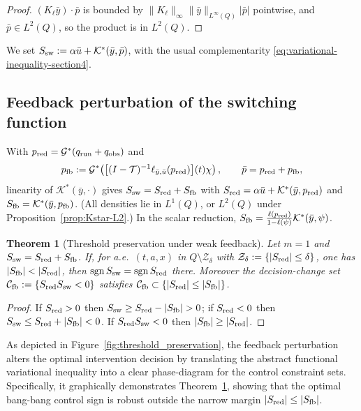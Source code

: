 \documentclass[pdflatex,sn-mathphys-num]{sn-jnl}
\theoremstyle{plain}
\newtheorem{theorem}{Theorem}[section]
\theoremstyle{definition}
\theoremstyle{remark}
\DeclareMathOperator{\sgn}{sgn}
\begin{document}
\begin{proof}
$(K_\ell\bar y)\cdot\bar p$ is bounded by $\|K_\ell\|_\infty\|\bar
y\|_{L^\infty(Q)}|\bar p|$ pointwise, and $\bar p\in L^2(Q)$, so the product is
in $L^2(Q)$.
\end{proof}

We set $S_{\rm sw}:=\alpha\bar u+\mathcal K^*(\bar y,\bar p)$, with the usual
complementarity \eqref{eq:variational-inequality-section4}.

\subsection{Feedback perturbation of the switching function}
\label{subsec:switching-perturbation}
With $p_{\rm red}=\mathcal G^*(q_{\rm run}+q_{\rm obs})$ and
\[
p_{\rm fb}
:=
\mathcal G^*\!\left(\big[(I-\mathcal T)^{-1}\ell_{\bar y,\bar u}(p_{\rm red})\big](t)\chi\right),
\qquad
\bar p=p_{\rm red}+p_{\rm fb},
\]
linearity of $\mathcal K^*(\bar y,\cdot)$ gives
$S_{\rm sw}=S_{\rm red}+S_{\rm fb}$ with
$S_{\rm red}=\alpha\bar u+\mathcal K^*(\bar y,p_{\rm red})$ and
$S_{\rm fb}=\mathcal K^*(\bar y,p_{\rm fb})$. (All densities lie in $L^1(Q)$,
or $L^2(Q)$ under Proposition~\ref{prop:Kstar-L2}.) In the scalar reduction,
$S_{\rm fb}=\frac{\ell(p_{\rm red})}{1-\ell(\psi)}\mathcal K^*(\bar y,\psi)$.

\begin{theorem}[Threshold preservation under weak feedback]
\label{thm:threshold-preservation}
Let $m=1$ and $S_{\rm sw}=S_{\rm red}+S_{\rm fb}$. If, for a.e.\ $(t,a,x)$ in
$Q\setminus\mathcal Z_\delta$ with
$\mathcal Z_\delta:=\{|S_{\rm red}|\le\delta\}$, one has
$|S_{\rm fb}|<|S_{\rm red}|$, then $\sgn S_{\rm sw}=\sgn S_{\rm red}$ there.
Moreover the decision-change set
$\mathcal C_{\rm fb}:=\{S_{\rm red}S_{\rm sw}<0\}$ satisfies
$\mathcal C_{\rm fb}\subset\{|S_{\rm red}|\le|S_{\rm fb}|\}$.
\end{theorem}

\begin{proof}
If $S_{\rm red}>0$ then $S_{\rm sw}\ge S_{\rm red}-|S_{\rm fb}|>0$; if
$S_{\rm red}<0$ then $S_{\rm sw}\le S_{\rm red}+|S_{\rm fb}|<0$. If
$S_{\rm red}S_{\rm sw}<0$ then $|S_{\rm fb}|\ge|S_{\rm red}|$.
\end{proof}

As depicted in Figure~\ref{fig:threshold_preservation}, the feedback perturbation alters the optimal intervention decision by translating the abstract functional variational inequality into a clear phase-diagram for the control constraint sets. Specifically, it graphically demonstrates Theorem~\ref{thm:threshold-preservation}, showing that the optimal bang-bang control sign is robust outside the narrow margin $|S_{\rm red}| \le |S_{\rm fb}|$.
\end{document}
